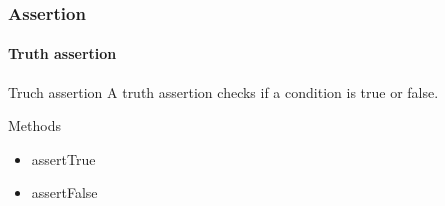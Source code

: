 \begin{frame}[parent={concept:assertion}, hasprev=false, hasnext=false]
\frametitle{Assertion}
\framesubtitle{Truth assertion}
\label{concept:junit-truth-assertion}
\label{concept:truth-assertion}

\begin{block:concept}{Truch assertion}
A truth assertion checks if a condition is true or false.
\end{block:concept}


\begin{block:fact}{Methods}
\begin{itemize}
	\item assertTrue
	\item assertFalse
\end{itemize}
\end{block:fact}

\hfill
{}
\end{frame}